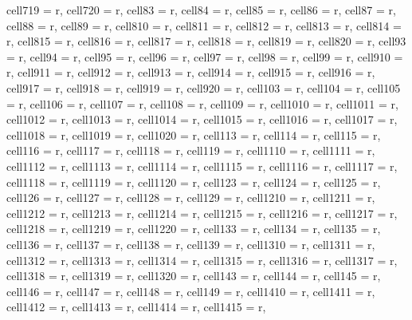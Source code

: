 \documentclass[journal]{IEEEtran}
\begin{document}
\begin{table}
\begin{adjustbox}{width=\textwidth}
\begin{tblr}
{  cell{7}{19} = {r},
  cell{7}{20} = {r},
  cell{8}{3} = {r},
  cell{8}{4} = {r},
  cell{8}{5} = {r},
  cell{8}{6} = {r},
  cell{8}{7} = {r},
  cell{8}{8} = {r},
  cell{8}{9} = {r},
  cell{8}{10} = {r},
  cell{8}{11} = {r},
  cell{8}{12} = {r},
  cell{8}{13} = {r},
  cell{8}{14} = {r},
  cell{8}{15} = {r},
  cell{8}{16} = {r},
  cell{8}{17} = {r},
  cell{8}{18} = {r},
  cell{8}{19} = {r},
  cell{8}{20} = {r},
  cell{9}{3} = {r},
  cell{9}{4} = {r},
  cell{9}{5} = {r},
  cell{9}{6} = {r},
  cell{9}{7} = {r},
  cell{9}{8} = {r},
  cell{9}{9} = {r},
  cell{9}{10} = {r},
  cell{9}{11} = {r},
  cell{9}{12} = {r},
  cell{9}{13} = {r},
  cell{9}{14} = {r},
  cell{9}{15} = {r},
  cell{9}{16} = {r},
  cell{9}{17} = {r},
  cell{9}{18} = {r},
  cell{9}{19} = {r},
  cell{9}{20} = {r},
  cell{10}{3} = {r},
  cell{10}{4} = {r},
  cell{10}{5} = {r},
  cell{10}{6} = {r},
  cell{10}{7} = {r},
  cell{10}{8} = {r},
  cell{10}{9} = {r},
  cell{10}{10} = {r},
  cell{10}{11} = {r},
  cell{10}{12} = {r},
  cell{10}{13} = {r},
  cell{10}{14} = {r},
  cell{10}{15} = {r},
  cell{10}{16} = {r},
  cell{10}{17} = {r},
  cell{10}{18} = {r},
  cell{10}{19} = {r},
  cell{10}{20} = {r},
  cell{11}{3} = {r},
  cell{11}{4} = {r},
  cell{11}{5} = {r},
  cell{11}{6} = {r},
  cell{11}{7} = {r},
  cell{11}{8} = {r},
  cell{11}{9} = {r},
  cell{11}{10} = {r},
  cell{11}{11} = {r},
  cell{11}{12} = {r},
  cell{11}{13} = {r},
  cell{11}{14} = {r},
  cell{11}{15} = {r},
  cell{11}{16} = {r},
  cell{11}{17} = {r},
  cell{11}{18} = {r},
  cell{11}{19} = {r},
  cell{11}{20} = {r},
  cell{12}{3} = {r},
  cell{12}{4} = {r},
  cell{12}{5} = {r},
  cell{12}{6} = {r},
  cell{12}{7} = {r},
  cell{12}{8} = {r},
  cell{12}{9} = {r},
  cell{12}{10} = {r},
  cell{12}{11} = {r},
  cell{12}{12} = {r},
  cell{12}{13} = {r},
  cell{12}{14} = {r},
  cell{12}{15} = {r},
  cell{12}{16} = {r},
  cell{12}{17} = {r},
  cell{12}{18} = {r},
  cell{12}{19} = {r},
  cell{12}{20} = {r},
  cell{13}{3} = {r},
  cell{13}{4} = {r},
  cell{13}{5} = {r},
  cell{13}{6} = {r},
  cell{13}{7} = {r},
  cell{13}{8} = {r},
  cell{13}{9} = {r},
  cell{13}{10} = {r},
  cell{13}{11} = {r},
  cell{13}{12} = {r},
  cell{13}{13} = {r},
  cell{13}{14} = {r},
  cell{13}{15} = {r},
  cell{13}{16} = {r},
  cell{13}{17} = {r},
  cell{13}{18} = {r},
  cell{13}{19} = {r},
  cell{13}{20} = {r},
  cell{14}{3} = {r},
  cell{14}{4} = {r},
  cell{14}{5} = {r},
  cell{14}{6} = {r},
  cell{14}{7} = {r},
  cell{14}{8} = {r},
  cell{14}{9} = {r},
  cell{14}{10} = {r},
  cell{14}{11} = {r},
  cell{14}{12} = {r},
  cell{14}{13} = {r},
  cell{14}{14} = {r},
  cell{14}{15} = {r},
}
\end{tblr}
\end{adjustbox}
\end{table}
\end{document}
